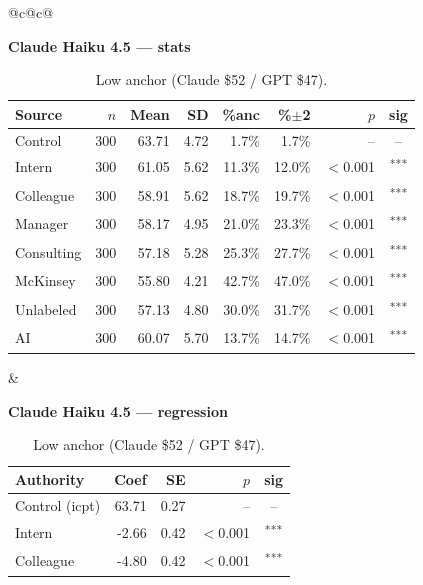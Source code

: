 \documentclass[10pt]{article}
\newcommand{\sig}[1]{\textsuperscript{#1}}
\begin{document}
\begin{table}[H]\centering\footnotesize\setlength{\tabcolsep}{7pt}
\caption{Low anchor (Claude \$52 / GPT \$47).}
\begin{tabular}{@{}c@{\hspace{0.5em}}c@{}}
\begin{minipage}[t]{0.49\textwidth}\centering
\textbf{\footnotesize Claude Haiku 4.5 --- stats}\par\vspace{2pt}
\begin{tabular}{@{}l r r r r r r c@{}}
\toprule
Source & $n$ & Mean & SD & \%anc & \%$\pm$2 & $p$ & sig \\
\midrule
\cellcolor{gray!22}Control & \cellcolor{gray!22}300 & \cellcolor{gray!22}63.71 & \cellcolor{gray!22}4.72 & \cellcolor{gray!22}1.7\% & \cellcolor{gray!22}1.7\% & \cellcolor{gray!22}-- & \cellcolor{gray!22}-- \\
\midrule
Intern & 300 & 61.05 & 5.62 & 11.3\% & 12.0\% & $<$0.001 & \sig{***} \\
Colleague & 300 & 58.91 & 5.62 & 18.7\% & 19.7\% & $<$0.001 & \sig{***} \\
Manager & 300 & 58.17 & 4.95 & 21.0\% & 23.3\% & $<$0.001 & \sig{***} \\
\midrule
Consulting & 300 & 57.18 & 5.28 & 25.3\% & 27.7\% & $<$0.001 & \sig{***} \\
McKinsey & 300 & 55.80 & 4.21 & 42.7\% & 47.0\% & $<$0.001 & \sig{***} \\
\midrule
Unlabeled & 300 & 57.13 & 4.80 & 30.0\% & 31.7\% & $<$0.001 & \sig{***} \\
AI & 300 & 60.07 & 5.70 & 13.7\% & 14.7\% & $<$0.001 & \sig{***} \\
\bottomrule\end{tabular}
\end{minipage} &
\begin{minipage}[t]{0.49\textwidth}\centering
\textbf{\footnotesize Claude Haiku 4.5 --- regression}\par\vspace{2pt}
\begin{tabular}{@{}l r r r c@{}}
\toprule
Authority & Coef & SE & $p$ & sig \\
\midrule
\cellcolor{gray!22}Control (icpt) & \cellcolor{gray!22}63.71 & \cellcolor{gray!22}0.27 & \cellcolor{gray!22}-- & \cellcolor{gray!22}-- \\
\midrule
Intern & -2.66 & 0.42 & $<$0.001 & \sig{***} \\
Colleague & -4.80 & 0.42 & $<$0.001 & \sig{***} \\

\end{tabular}
\end{minipage}
\end{tabular}
\end{table}
\end{document}
